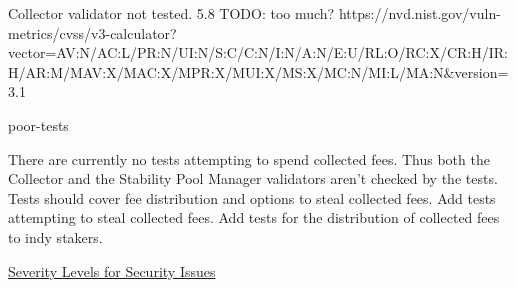 \vuln
    { %
      Collector validator not tested.
    }
    { %
      5.8 TODO: too much?
    }
    { %
    https://nvd.nist.gov/vuln-metrics/cvss/v3-calculator?vector=AV:N/AC:L/PR:N/UI:N/S:C/C:N/I:N/A:N/E:U/RL:O/RC:X/CR:H/IR:H/AR:M/MAV:X/MAC:X/MPR:X/MUI:X/MS:X/MC:N/MI:L/MA:N&version=3.1
    }
    { %
    \item poor-tests
    }
    { %
    There are currently no tests attempting to spend collected fees. Thus both the Collector and the Stability Pool Manager validators aren't checked by the tests.
    Tests should cover fee distribution and options to steal collected fees.
    }
    { %
      Add tests attempting to steal collected fees. Add tests for the distribution of collected fees to indy stakers.
    }
    { %
    \item\href{https://www.atlassian.com/trust/security/security-severity-levels}{Severity Levels for Security Issues}
    \item\href{github.com}{}
    }
